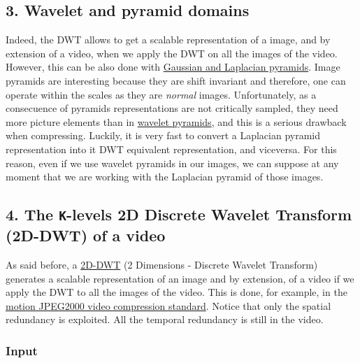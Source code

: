     \hypertarget{wavelet-and-pyramid-domains}{%
\subsection{3. Wavelet and pyramid
domains}\label{wavelet-and-pyramid-domains}}

Indeed, the DWT allows to get a scalable representation of a image, and
by extension of a video, when we apply the DWT on all the images of the
video. However, this can be also done with
\href{https://en.wikipedia.org/wiki/Pyramid_(image_processing)}{Gaussian
and Laplacian pyramids}. Image pyramids are interesting because they are
shift invariant and therefore, one can operate within the scales as they
are \emph{normal} images. Unfortunately, as a consecuence of pyramids
representations are not critically sampled, they need more picture
elements than in
\href{http://www.vtvt.ece.vt.edu/research/references/video/DCT_Video_Compression/Zhang92a.pdf}{wavelet
pyramids}, and this is a serious drawback when compressing. Luckily, it
is very fast to convert a Laplacian pyramid representation into it DWT
equivalent representation, and viceversa. For this reason, even if we
use wavelet pyramids in our images, we can suppose at any moment that we
are working with the Laplacian pyramid of those images.

    \hypertarget{the--levels-2d-discrete-wavelet-transform-2d-dwt-of-a-video}{%
\subsection{\texorpdfstring{4. The \texttt{K}-levels 2D Discrete Wavelet
Transform (2D-DWT) of a
video}{4. The -levels 2D Discrete Wavelet Transform (2D-DWT) of a video}}\label{the--levels-2d-discrete-wavelet-transform-2d-dwt-of-a-video}}

As said before, a
\href{https://en.wikipedia.org/wiki/Discrete_wavelet_transform}{2D-DWT}
(2 Dimensions - Discrete Wavelet Transform) generates a scalable
representation of an image and by extension, of a video if we apply the
DWT to all the images of the video. This is done, for example, in the
\href{https://en.wikipedia.org/wiki/JPEG_2000}{motion JPEG2000 video
compression standard}. Notice that only the spatial redundancy is
exploited. All the temporal redundancy is still in the video.

    \hypertarget{input}{%
\subsubsection{Input}\label{input}}

